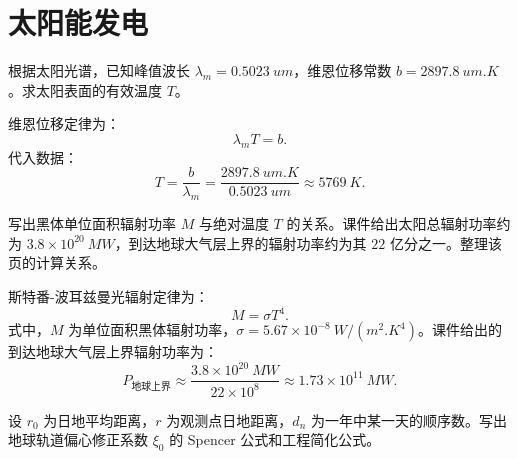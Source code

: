 \section{太阳能发电}

\begin{problem}[维恩位移定律求太阳表面有效温度]\label{exer:calc_04_solar_p014_01}
根据太阳光谱，已知峰值波长 \(\lambda_m = \qty{0.5023}{um}\)，维恩位移常数 \(b = \qty{2897.8}{um.K}\)。求太阳表面的有效温度 \(T\)。
\end{problem}

\begin{solution}
维恩位移定律为：
\begin{equation}
\lambda_m T = b.
\end{equation}
代入数据：
\begin{equation}
T = \frac{b}{\lambda_m}
  = \frac{\qty{2897.8}{um.K}}{\qty{0.5023}{um}}
  \approx \qty{5769}{K}.
\end{equation}
\end{solution}

\begin{problem}\label{exer:calc_04_solar_p015_01}
写出黑体单位面积辐射功率 \(M\) 与绝对温度 \(T\) 的关系。课件给出太阳总辐射功率约为 \(3.8 \times 10^{20}\ \unit{MW}\)，到达地球大气层上界的辐射功率约为其 \(22\) 亿分之一。整理该页的计算关系。
\end{problem}

\begin{solution}
斯特番-波耳兹曼光辐射定律为：
\begin{equation}
M = \sigma T^4.
\end{equation}
式中，\(M\) 为单位面积黑体辐射功率，\(\sigma = 5.67 \times 10^{-8}\ \unit{W/(m^2.K^4)}\)。课件给出的到达地球大气层上界辐射功率为：
\begin{equation}
P_{\text{地球上界}}
\approx \frac{3.8 \times 10^{20}\ \unit{MW}}{22 \times 10^8}
\approx 1.73 \times 10^{11}\ \unit{MW}.
\end{equation}
\end{solution}

\begin{problem}[地球轨道偏心修正系数]\label{exer:calc_04_solar_p024_01}
设 \(r_0\) 为日地平均距离，\(r\) 为观测点日地距离，\(d_n\) 为一年中某一天的顺序数。写出地球轨道偏心修正系数 \(\xi_0\) 的 Spencer 公式和工程简化公式。
\end{problem}

